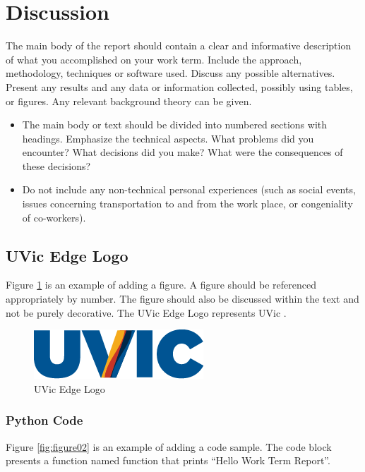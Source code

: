 \section{Discussion}
    The main body of the report should contain a clear and informative description of what you accomplished on your work term. Include the approach, methodology, techniques or software used. Discuss any possible alternatives. Present any results and any data or information collected, possibly using tables, or figures. Any relevant background theory can be given.

    \begin{itemize}
    	\item The main body or text should be divided into numbered sections with headings. Emphasize the technical aspects. What problems did you encounter? What decisions did you make? What were the consequences of these decisions?
    	\item Do not include any non-technical personal experiences (such as social events, issues concerning transportation to and from the work place, or congeniality of co-workers).
    \end{itemize}
	
	\subsection{UVic Edge Logo}
		Figure \ref{fig:figure01} is an example of adding a figure. A figure should be referenced appropriately by number. The figure should also be discussed within the text and not be purely decorative. The UVic Edge Logo represents UVic \cite{uvicwebsite}.
        \vspace{0.75cm}
	
		\begin{figure}[h!]
			\begin{center}
  				\includegraphics[scale=0.75]{figures/figure01.png}
  				\caption{UVic Edge Logo}
  				\label{fig:figure01}
  			\end{center}
		\end{figure}
		
		\subsubsection{Python Code}
		  Figure \ref{fig:figure02} is an example of adding a code sample. The code block presents a function named function that prints ``Hello Work Term Report''.
		
